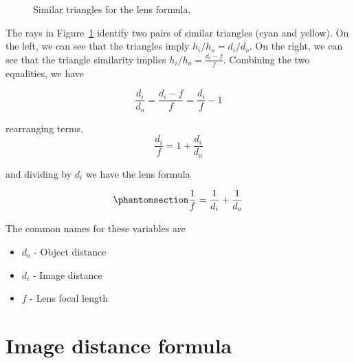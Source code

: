 \documentclass[
  letterpaper,
]{book}
\providecommand{\tightlist}{%
  \setlength{\itemsep}{0pt}\setlength{\parskip}{0pt}}\usepackage{longtable,booktabs,array}
\begin{document}
\begin{figure}


\caption{\label{fig-lensmaker-similartriangles}Similar triangles for the
lens formula.}

\end{figure}%

The rays in Figure~\ref{fig-lensmaker-similartriangles} identify two
pairs of similar triangles (cyan and yellow). On the left, we can see
that the triangles imply \(h_i/h_o = d_i/d_o\). On the right, we can see
that the triangle similarity implies \(h_i/h_o = \frac{d_i - f}{f}\).
Combining the two equalities, we have

\[\frac{d_i}{d_o} = \frac{d_i - f}{f} = \frac{d_i}{f} - 1 \]

rearranging terms, \[ 
\frac{d_i}{f}  = 1 + \frac{d_i}{d_o} 
\]

and dividing by \(d_i\) we have the lens formula

\begin{equation}\phantomsection\label{eq-lensformula}{ 
\frac{1}{f}    = \frac{1}{d_i} + \frac{1}{d_o} 
}\end{equation}

The common names for these variables are

\begin{itemize}
\tightlist
\item
  \(d_o\) - Object distance
\item
  \(d_i\) - Image distance
\item
  \(f\) - Lens focal length
\end{itemize}

\section{Image distance formula}\label{sec-optics-imagedistance}
\end{document}
